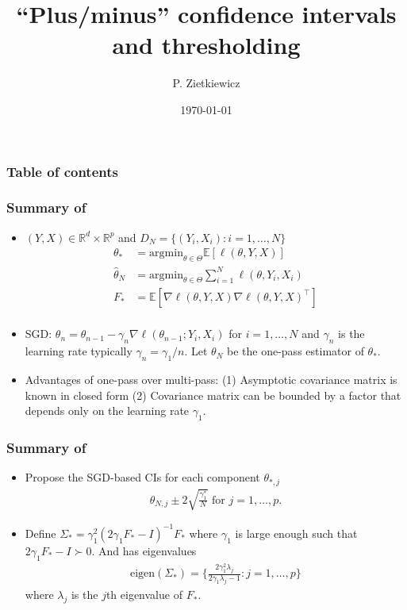 \documentclass{beamer}
\title[``Plus/minus'' CIs]{``Plus/minus'' confidence intervals and thresholding}
\author[]{P. Zietkiewicz}
\date{\today}
\newcommand{\amin}{\text{argmin}}
\newcommand{\expect}[1]{\mathbb{E}[#1]}
\newcommand{\reals}{\mathbb{R}}
\begin{document}
\frame{\titlepage}

\begin{frame}
	\frametitle{Table of contents}
	\tableofcontents
\end{frame}

\begin{frame}
  \frametitle{Summary of~\citet{chee:2023}}
  \begin{itemize}
  \item $(Y, X) \in \reals^d \times \reals^p$ and $D_N = \{(Y_i, X_i): i=1,\dots,N\}$
    \begin{align*}
      \theta_* &= \amin_{\theta \in \Theta} \expect{\ell(\theta, Y, X)}\\
      \hat{\theta}_N &= \amin_{\theta \in \Theta} \sum_{i=1}^N\ell(\theta, Y_i, X_i)\\
      F_* &= \expect{\nabla \ell(\theta, Y, X) \nabla \ell(\theta, Y, X)^\top}\\
    \end{align*}
  \item SGD: $\theta_n = \theta_{n-1} - \gamma_n \nabla \ell(\theta_{n-1}; Y_{i}, X_{i})$ for $i=1,\dots,N$ and $\gamma_n$ is the learning rate typically $\gamma_n = \gamma_1 / n$. Let $\theta_N$ be the one-pass estimator of $\theta_*$.
  \item Advantages of one-pass over multi-pass: (1) Asymptotic covariance matrix is known in closed form (2) Covariance matrix can be bounded by a factor that depends only on the learning rate $\gamma_1$.
  \end{itemize}
\end{frame}

\begin{frame}
\frametitle{Summary of~\citet{chee:2023}}
\begin{itemize}
\item Propose the SGD-based CIs for each component $\theta_{*,j}$
  \begin{align*}
    \theta_{N,j} \pm 2\sqrt{\frac{\gamma_1^*}{N}} \text{ for } j=1,\dots,p.
  \end{align*}
\item Define $\Sigma_* = \gamma_1^2 {(2 \gamma_1 F_* - I)}^{-1} F_*$ where $\gamma_1$ is large enough such that $2\gamma_1 F_* - I \succ 0$. And has eigenvalues
  \begin{align*}
    \text{eigen}(\Sigma_*) = \{\frac{2\gamma_1^2 \lambda_j}{2\gamma_1\lambda_j - 1} : j=1,\dots,p\}
  \end{align*}
  where $\lambda_j$ is the $j$th eigenvalue of $F_*$.
\end{itemize}
\end{frame}
\end{document}
